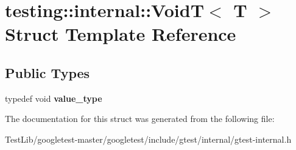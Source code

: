 \hypertarget{structtesting_1_1internal_1_1VoidT}{}\section{testing\+:\+:internal\+:\+:VoidT$<$ T $>$ Struct Template Reference}
\label{structtesting_1_1internal_1_1VoidT}
\subsection*{Public Types}
\begin{DoxyCompactItemize}
\item 
\mbox{\label{structtesting_1_1internal_1_1VoidT_a29e6a3f3989ddb47103944b350f1bec0}} 
typedef void {\bfseries value\+\_\+type}
\end{DoxyCompactItemize}


The documentation for this struct was generated from the following file\+:\begin{DoxyCompactItemize}
\item 
Test\+Lib/googletest-\/master/googletest/include/gtest/internal/gtest-\/internal.\+h\end{DoxyCompactItemize}
